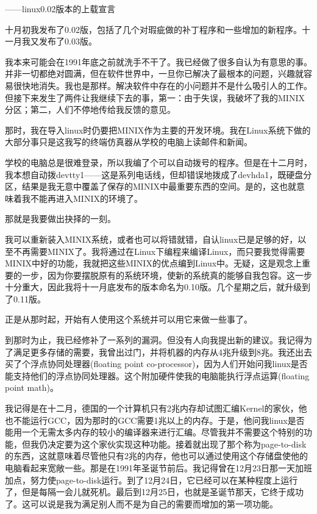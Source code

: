 ——linux0.02版本的上载宣言

 

十月初我发布了0.02版，包括了几个对瑕疵做的补丁程序和一些增加的新程序。十一月我又发布了0.03版。

我本来可能会在1991年底之前就洗手不干了。我已经做了很多自认为有意思的事。并非一切都绝对圆满，但在软件世界中，一旦你已解决了最根本的问题，兴趣就容易很快地消失。我也是那样。解决软件中存在的小问题并不是什么吸引人的工作。但接下来发生了两件让我继续下去的事，第一：由于失误，我破坏了我的MINIX分区；第二，人们不停地传给我反馈的意见。

那时，我在导入linux时仍要把MINIX作为主要的开发环境。我在Linux系统下做的大部分事只是这我写的终端仿真器从学校的电脑上读邮件和新闻。

学校的电脑总是很难登录，所以我编了个可以自动拨号的程序。但是在十二月时，我本想自动拨devtty1——这是系列电话线，但却错误地拨成了devhda1，既硬盘分区，结果是我无意中覆盖了保存的MINIX中最重要东西的空间。是的，这也就意味着我不能再进入MINIX的环境了。

那就是我要做出抉择的一刻。

我可以重新装入MINIX系统，或者也可以将错就错，自认linux已是足够的好，以至不再需要MINIX了。我将通过在Linux下编程来编译Linux，而只要我觉得需要MINIX中好的功能，我就把这些MINIX的优点编到Linux中。无疑，这是观念上重要的一步，因为你要摆脱原有的系统环境，使新的系统真的能够自我包容。这一步十分重大，因此我将十一月底发布的版本命名为0.10版。几个星期之后，就升级到了0.11版。

正是从那时起，开始有人使用这个系统并可以用它来做一些事了。

到那时为止，我已经修补了一系列的漏洞。但没有人向我提出新的建议。我记得为了满足更多存储的需要，我曾出过门，并将机器的内存从4兆升级到8兆。我还出去买了个浮点协同处理器(floating point co-processor)，因为人们开始问我linux是否能支持他们的浮点协同处理器。这个附加硬件使我的电脑能执行浮点运算(floating point math)。

我记得是在十二月，德国的一个计算机只有2兆内存却试图汇编Kernel的家伙，他也不能运行GCC，因为那时的GCC需要1兆以上的内存。于是，他问我linux是否能用一个无需太多内存的较小的编译器来进行汇编。尽管我并不需要这个特别的功能，但我仍决定要为这个家伙实现这种功能。接着就出现了那个称为page-to-disk的东西，这就意味着尽管他只有2兆的内存，他也可以通过使用这个存储盘使他的电脑看起来宽敞一些。那是在1991年圣诞节前后。我记得曾在12月23日那一天加班加点，努力使page-to-disk运行。到了12月24日，它已经可以在某种程度上运行了，但是每隔一会儿就死机。最后到12月25日，也就是圣诞节那天，它终于成功了。这可以说是我为满足别人而不是为自己的需要而增加的第一项功能。

